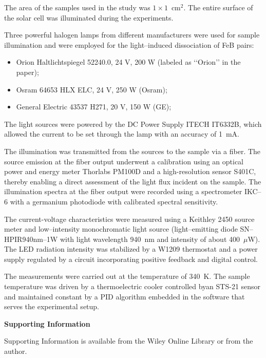 \documentclass{WileyMSP-template}
\begin{document}
The area of the samples used in the study was $1\times1$~cm$^2$.
The entire surface of the solar cell was illuminated during the experiments.

Three powerful halogen lamps from different manufacturers were used for sample illumination and were employed for the light--induced dissociation of FeB pairs:
\begin{itemize}
  \item Orion Haltlichtspiegel 52240.0, 24 V, 200 W (labeled as ‘‘Orion’’ in the paper);
  \item Osram 64653 HLX ELC, 24 V, 250 W (Osram);
  \item General Electric 43537 H271, 20 V, 150 W (GE);
\end{itemize}
The light sources were powered by the DC Power Supply ITECH IT6332B,
which allowed the current to be set through the lamp with an accuracy of 1~mA.

The illumination was transmitted from the sources to the sample via a fiber.
The source emission at the fiber output underwent a calibration using an optical power and energy meter Thorlabs PM100D and a high-resolution sensor S401C,
thereby enabling a direct assessment of the light flux incident on the sample.
The illumination spectra at the fiber output were recorded using a spectrometer IKC--6 with a germanium photodiode with calibrated spectral sensitivity.

The current-voltage characteristics were measured using a Keithley 2450 source meter and
low--intensity monochromatic light source (light--emitting diode SN--HPIR940nm--1W with light wavelength 940~nm and intensity of about 400~$\mu$W).
The LED radiation intensity was stabilized by a W1209 thermostat and a power supply regulated by a circuit incorporating positive feedback and digital control.

The measurements were carried out at the temperature of 340~K.
The sample temperature was driven by a thermoelectric cooler
controlled byan STS-21 sensor
and maintained constant by a PID algorithm embedded in the software that serves the experimental setup.


\medskip
\textbf{Supporting Information} \par %
Supporting Information is available from the Wiley Online Library or from the author.
\end{document}
